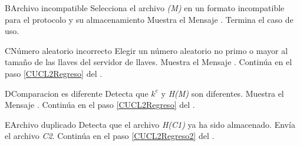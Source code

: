 \begin{UCtrayectoriaA}{B}{Archivo incompatible}
	\UCpaso [\UCactor] Selecciona el archivo \textit{(M)} en un formato incompatible para el protocolo y su almacenamiento
	\UCpaso Muestra el Mensaje .
	\UCpaso Termina el caso de uso.
\end{UCtrayectoriaA}

\begin{UCtrayectoriaA}{C}{Número aleatorio incorrecto}
	\UCpaso Elegir un número aleatorio no primo o mayor al tamaño de las llaves del servidor de llaves.
	\UCpaso Muestra el Mensaje .
	\UCpaso Continúa en el paso \ref{CUCL2Regreso} del .
\end{UCtrayectoriaA}

\begin{UCtrayectoriaA}{D}{Comparacion es diferente}
	\UCpaso Detecta que \textit{$k^{e}$} y \textit{H(M)} son diferentes.
	\UCpaso Muestra el Mensaje .
	\UCpaso Continúa en el paso \ref{CUCL2Regreso} del .
\end{UCtrayectoriaA}

\begin{UCtrayectoriaA}{E}{Archivo duplicado}
	\UCpaso Detecta que el archivo \textit{H(C1)} ya ha sido almacenado.
	\UCpaso Envía el archivo \textit{C2}.
	\UCpaso Continúa en el paso \ref{CUCL2Regreso2} del .
\end{UCtrayectoriaA}
